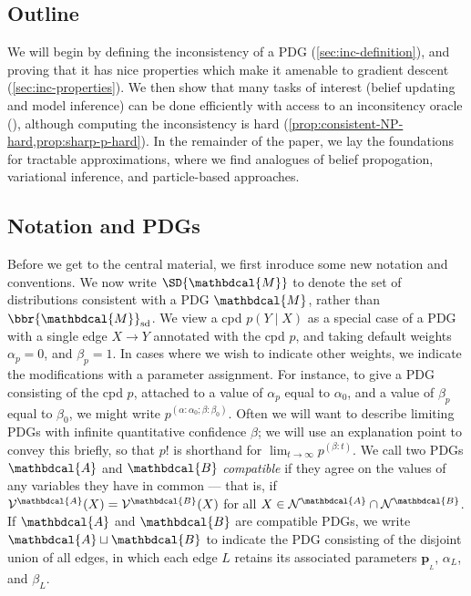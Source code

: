 \documentclass{article}
\theoremstyle{plain}
\theoremstyle{definition}
\theoremstyle{remark}
\newcommand\mat[1]{\mathbf{#1}}
\newcommand{\bp}[1][L]{\mat{p}_{\!_{#1}\!}}
\newcommand{\V}{\mathcal V}
\newcommand{\N}{\mathcal N}
\newcommand{\dg}[1]{\mathbdcal{#1}}
\newcommand{\bundle}{\mathbin{\sqcup}}
\begin{document}
\subsection*{Outline}
We will begin by defining the inconsistency of a PDG (\cref{sec:inc-definition}), and proving that it has nice properties which make it amenable to gradient descent (\cref{sec:inc-properties}). We then show that many tasks of interest (belief updating and model inference) can be done efficiently with access to an inconsitency oracle (), although computing the inconsistency is hard (\cref{prop:consistent-NP-hard,prop:sharp-p-hard}).
In the remainder of the paper, we lay the foundations for tractable approximations, where we find analogues of belief propogation, variational inference, and particle-based approaches.


\subsection*{Notation and PDGs}
Before we get to the central material, we first inroduce some new notation and conventions. We now write $\SD{\dg M}$ to denote
the set of distributions consistent with a PDG $\dg M$, rather than $\bbr{\dg M}_{\textrm{sd}}$. We view a cpd $p(Y \mid X)$ as a special case of a PDG with
a single edge $X \to Y$ annotated with the cpd $p$, and taking
default weights $\alpha_p = 0$, and $\beta_p = 1$. In cases where we wish
to indicate other weights, we indicate the modifications with a parameter
assignment. For instance, to give a PDG consisting of the cpd $p$, attached to
a value of $\alpha_p$ equal to $\alpha_0$, and
a value of $\beta_p$ equal to $\beta_0$, we might write
$ p^{(\alpha:\alpha_0;\beta : \beta_0)} $.
Often we will want to describe limiting PDGs with infinite quantitative confidence $\beta$; we will use an explanation point to convey this briefly, so that $p!$ is shorthand for
$\lim_{t \to \infty} p^{(\beta:t)}$.
%
We call two PDGs $\dg A$ and $\dg B$ \emph{compatible} if they agree
on the values of any variables they have in common --- that is, if
$\V^{\dg A}(X) = \V^{\dg B}(X)$ for all $X \in \N^{\dg A} \cap \N^{\dg B}$.
%
If $\dg A$ and $\dg B$ are compatible PDGs, we write $\dg A \bundle \dg B$ to indicate the PDG consisting of the disjoint union of all edges, in which each edge $L$ retains its associated parameters $\bp$, $\alpha_L$, and $\beta_L$.
\end{document}
